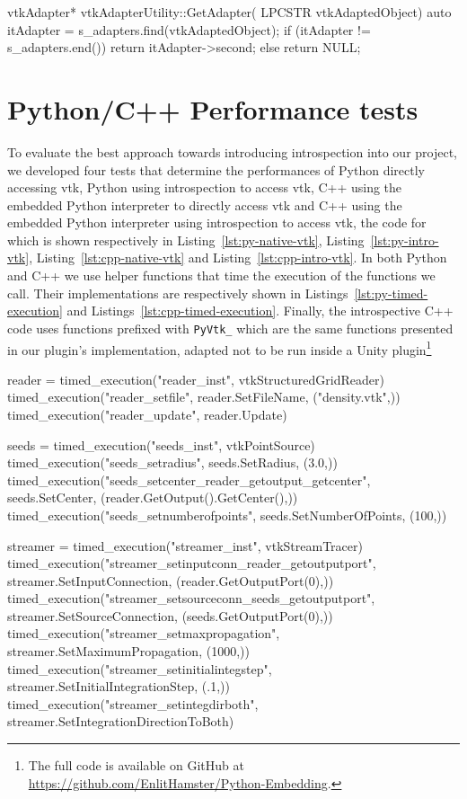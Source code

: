 \begin{appendices}
\begin{cpp}[label=lst:vtkAdapterutilityex,caption={Example vtkAdapterUtility.cpp},aboveskip=20pt]
vtkAdapter* vtkAdapterUtility::GetAdapter(
	LPCSTR vtkAdaptedObject)
{
	auto itAdapter = s_adapters.find(vtkAdaptedObject);
	if (itAdapter != s_adapters.end())
	{
		return itAdapter->second;
	}
	else
	{
		return NULL;
	}
}
\end{cpp}
    
\chapter{Python/C++ Performance tests}
\label{apx:streamtracer-performance-tests}

To evaluate the best approach towards introducing introspection into our project, we developed four tests that determine the performances of Python directly accessing \acrshort{vtk}, Python using introspection to access \acrshort{vtk}, C++ using the embedded Python interpreter to directly access \acrshort{vtk} and C++ using the embedded Python interpreter using introspection to access \acrshort{vtk}, the code for which is shown respectively in Listing~\ref{lst:py-native-vtk}, Listing~\ref{lst:py-intro-vtk}, Listing~\ref{lst:cpp-native-vtk} and Listing~\ref{lst:cpp-intro-vtk}. In both Python and C++ we use helper functions that time the execution of the functions we call. Their implementations are respectively shown in Listings~\ref{lst:py-timed-execution} and Listings~\ref{lst:cpp-timed-execution}. Finally, the introspective C++ code uses functions prefixed with \verb|PyVtk_| which are the same functions presented in our plugin's implementation, adapted not to be run inside a Unity plugin\footnote{The full code is available on GitHub at \url{https://github.com/EnlitHamster/Python-Embedding}.}

\begin{python}[label=lst:py-native-vtk,caption={Native Python VTK benchmark script},aboveskip=20pt]
reader = timed_execution("reader_inst", vtkStructuredGridReader)
timed_execution("reader_setfile", reader.SetFileName, ("density.vtk",))
timed_execution("reader_update", reader.Update)

seeds = timed_execution("seeds_inst", vtkPointSource)
timed_execution("seeds_setradius", seeds.SetRadius, (3.0,))
timed_execution("seeds_setcenter_reader_getoutput_getcenter", seeds.SetCenter, (reader.GetOutput().GetCenter(),))
timed_execution("seeds_setnumberofpoints", seeds.SetNumberOfPoints, (100,))

streamer = timed_execution("streamer_inst", vtkStreamTracer)
timed_execution("streamer_setinputconn_reader_getoutputport", streamer.SetInputConnection, (reader.GetOutputPort(0),))
timed_execution("streamer_setsourceconn_seeds_getoutputport", streamer.SetSourceConnection, (seeds.GetOutputPort(0),))
timed_execution("streamer_setmaxpropagation", streamer.SetMaximumPropagation, (1000,))
timed_execution("streamer_setinitialintegstep", streamer.SetInitialIntegrationStep, (.1,))
timed_execution("streamer_setintegdirboth", streamer.SetIntegrationDirectionToBoth)


\end{python}
\end{appendices}
